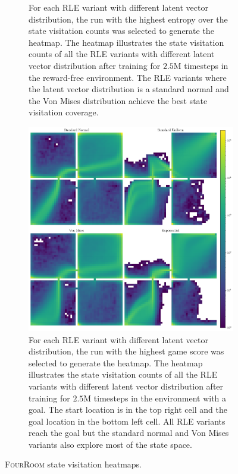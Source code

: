 \begin{figure}[h!]
\begin{subfigure}[b]{0.45\textwidth}
    \caption{For each \textsc{RLE} variant with different latent vector distribution, the run with the highest entropy over the state visitation counts was selected to generate the heatmap. The heatmap illustrates the state visitation counts of all the \textsc{RLE} variants with different latent vector distribution after training for $2.5$M timesteps in the reward-free environment. The \textsc{RLE} variants where the latent vector distribution is a standard normal and the Von Mises distribution achieve the best state visitation coverage.}
    \label{fig:gridworld-heatmap-nogoal-distributions}
  \end{subfigure}
  \hfill
  \begin{subfigure}[b]{0.45\textwidth}
    \centering
    \includegraphics[width=\textwidth]{figures/gridworld_heatmaps_goal_distributions.pdf}
    \caption{For each \textsc{RLE} variant with different latent vector distribution, the run with the highest game score was selected to generate the heatmap. The heatmap illustrates the state visitation counts of all the \textsc{RLE} variants with different latent vector distribution after training for $2.5$M timesteps in the environment with a goal. The start location is in the top right cell and the goal location in the bottom left cell. All \textsc{RLE} variants reach the goal but the standard normal and Von Mises variants also explore most of the state space.}
    \label{fig:gridworld-heatmap-goal-distributions}
  \end{subfigure}
  \caption{\textsc{FourRoom} state visitation heatmaps.}
  \label{fig:gridworld-statemaps}
\end{figure}

